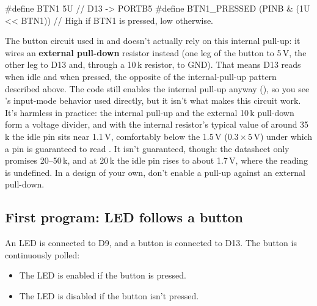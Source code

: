 \begin{ccode}
#define BTN1 5U                               // D13 -> PORTB5
#define BTN1_PRESSED (PINB & (1U << BTN1)) // High if BTN1 is pressed, low otherwise.
\end{ccode}

\noindent The button circuit used in  and  doesn't actually rely on
this internal pull-up: it wires an \textbf{external pull-down} resistor instead (one leg of the
button to 5\,V, the other leg to D13 and, through a 10\,k\textohm{} resistor, to GND). That means
D13 reads  when idle and  when pressed, the opposite of the internal-pull-up pattern
described above. The code still enables the internal pull-up anyway (),
so you see 's input-mode behavior used directly, but it isn't what makes this circuit
work. It's harmless in practice: the internal pull-up and the external 10\,k\textohm{} pull-down
form a voltage divider, and with the internal resistor's typical value of around 35\,k\textohm{}
the idle pin sits near 1.1\,V, comfortably below the 1.5\,V ($0.3 \times 5$\,V) under which a pin
is guaranteed to read . It isn't guaranteed, though: the datasheet only promises
20--50\,k\textohm, and at 20\,k\textohm{} the idle pin rises to about 1.7\,V, where the reading is
undefined. In a design of your own, don't enable a pull-up against an external pull-down.

\subsection{First program: LED follows a button}
\label{c2:a:5}
An LED is connected to D9, and a button is connected to D13. The button is continuously polled:
\begin{itemize}
  \item The LED is enabled if the button is pressed.
  \item The LED is disabled if the button isn't pressed.
\end{itemize}



